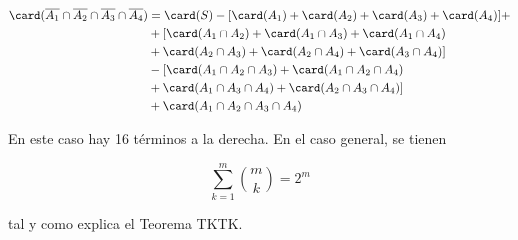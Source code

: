 \begin{alignat*}{2}
  \card(\overline{A_1} \cap \overline{A_2} \cap \overline{A_3} \cap
    \overline{A_4})
    &= \card(S) - [\card(A_1) + \card(A_2) + \card(A_3) + \card(A_4)] + \\
    &+ [\card(A_1 \cap A_2) + \card(A_1 \cap A_3) + \card(A_1 \cap A_4) \\
    &+ \card(A_2 \cap A_3) + \card(A_2 \cap A_4) + \card(A_3 \cap A_4)] \\
    &- [\card(A_1 \cap A_2 \cap A_3) + \card(A_1 \cap A_2 \cap A_4) \\
    &+ \card(A_1 \cap A_3 \cap A_4) + \card(A_2 \cap A_3 \cap A_4)] \\
    &+ \card(A_1 \cap A_2 \cap A_3 \cap A_4)
\end{alignat*}

En este caso hay 16 términos a la derecha. En el caso general, se tienen

$$ \sum_{k=1}^m {m \choose k} = 2^m $$

\noindent tal y como explica el Teorema TKTK.

